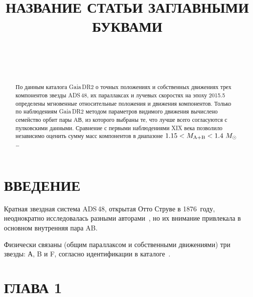 \documentclass[
 aps, pra,
 amsmath,amssymb,
 11pt,
 final,
tightenlines,
 twoside,
 twocolumn,
 nofloats,
nofootinbib,
 superscriptaddress,
showkeys,
showkeywords,
 ]
{revtex4-2}
\begin{document}



\title{НАЗВАНИЕ СТАТЬИ ЗАГЛАВНЫМИ БУКВАМИ}

\author{~}

\author{~}


\begin{abstract}
По данным каталога Gaia\,DR2 о точных положениях и собственных
движениях трех компонентов звезды  ADS\,48, их параллаксах и
лучевых скоростях на эпоху 2015.5  определены мгновенные
относительные положения и движения компонентов. Только по
наблюдениям Gaia\,DR2 методом параметров видимого движения
вычислено семейство орбит пары АВ, из которого выбраны те, что
лучше всего согласуются с пулковскими данными. Сравнение с первыми
наблюдениями XIX века позволило независимо оценить сумму масс
компонентов в диапазоне $1.15<M_{\rm A+B}<1.4~M_\odot$\ldots
\end{abstract}

\maketitle

\section{ВВЕДЕНИЕ}

Кратная звездная система ADS\,48, открытая Отто Струве в
1876~году, неоднократно исследовалась разными авторами~\citep[см.,
например,][]{G-L, Hopman}, но их внимание привлекала в основном
внутренняя пара AB. 

Физически связаны (общим параллаксом и
собственными движениями) три звезды: А, B и F, согласно
идентификации в каталоге~\citet{WDS}. 



\section{ГЛАВА 1}
\end{document}
